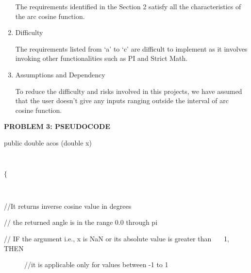 \documentclass[12pt]{article}
\begin{document}
\begin{enumerate}
The requirements identified in the Section 2 satisfy all the characteristics of the arc cosine function. \par


\vspace{\baselineskip}
	\item Difficulty\par

The requirements listed from ‘a’ to ‘c’ are difficult to implement as it involves invoking other functionalities such as PI and Strict Math. \par


\vspace{\baselineskip}
	\item Assumptions and Dependency



To reduce the difficulty and risks involved in this projects, we have assumed that the user doesn’t give any inputs ranging outside the interval of arc cosine function.\par

\vspace{\baselineskip}

\end{enumerate}\par

\vspace{\baselineskip}
\textbf{PROBLEM 3: PSEUDOCODE}\par

public double acos (double x){\fontsize{13pt}{15.6pt}\selectfont  \\
\par}$ \{ $ {\fontsize{13pt}{15.6pt}\selectfont  \  \par}\par

//It returns inverse cosine value in degrees \par

// the returned angle is in the range 0.0 through pi \par

\begin{adjustwidth}{0.5in}{0.0in}
// IF the argument i.e., x is NaN or its absolute value is greater than \ \ \  1, THEN\par

\end{adjustwidth}

\tab \ \ \ \ \ \  //it is applicable only for values between -1 to 1\par
\end{document}
